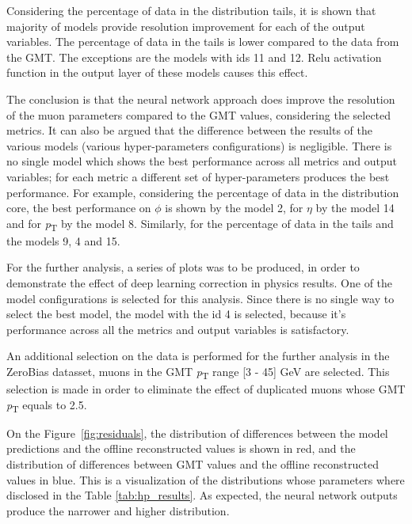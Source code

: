 \documentclass[10pt, paper=a4, UKenglish]{article}
\begin{document}
Considering the percentage of data in the distribution tails, it is shown that majority of models provide resolution improvement for each of the output variables. The percentage of data in the tails is lower compared to the data from the GMT. The exceptions are the models with ids 11 and 12. Relu activation function in the output layer of these models causes this effect.

The conclusion is that the neural network approach does improve the resolution of the muon parameters compared to the GMT values, considering the selected metrics. It can also be argued that the difference between the results of the various models (various hyper-parameters configurations) is negligible. There is no single model which shows the best performance across all metrics and output variables; for each metric a different set of hyper-parameters produces the best performance. For example, considering the percentage of data in the distribution core, the best performance on $\phi$ is shown by the model 2, for $\eta$ by the model 14 and for \textit{p}\textsubscript{T} by the model 8. Similarly, for the percentage of data in the tails and the models 9, 4 and 15. 

For the further analysis, a series of plots was to be produced, in order to demonstrate the effect of deep learning correction in physics results. One of the model configurations is selected for this analysis. Since there is no single way to select the best model, the model with the id 4 is selected, because it's performance across all the metrics and output variables is satisfactory.

An additional selection on the data is performed for the further analysis in the ZeroBias datasset, muons in the GMT \textit{p}\textsubscript{T} range [3 - 45] GeV are selected. This selection is made in order to eliminate the effect of duplicated muons whose GMT \textit{p}\textsubscript{T} equals to 2.5.

On the Figure~\ref{fig:residuals}, the distribution of differences between the model predictions and the offline reconstructed values is shown in red, and the distribution of differences between GMT values and the offline reconstructed values in blue. This is a visualization of the distributions whose parameters where disclosed in the Table \ref{tab:hp_results}. As expected, the neural network outputs produce the narrower and higher distribution. 
 
\end{document}
